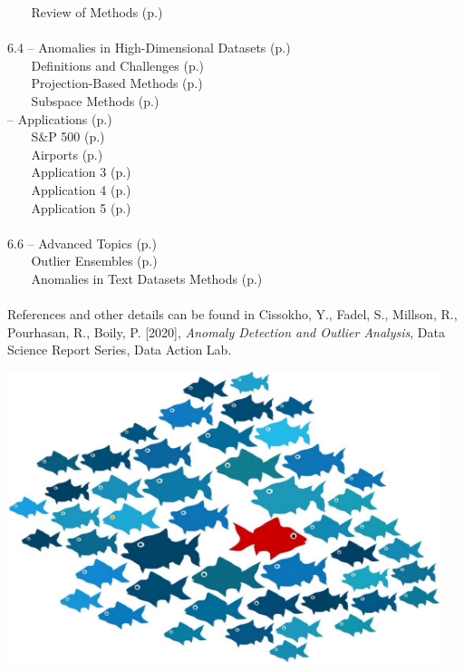 \documentclass[20pt,landscape,footrule,headrule]{foils}
\newcommand{\localtextbulletone}{{\raisebox{.45ex}{\rule{.6ex}{.6ex}}}}
\begin{document}
\textcolor{white}{ab} \localtextbulletone\ Review of Methods (p.\@\pageref{6.3.2}) 
\normalsize \ \\ \ \\ 
6.4 -- Anomalies in High-Dimensional Datasets (p.\pageref{6.4}) \\ 
\small
\textcolor{white}{ab} \localtextbulletone\ Definitions and Challenges (p.\@\pageref{6.4.1}) \\ 
\textcolor{white}{ab} \localtextbulletone\ Projection-Based Methods (p.\@\pageref{6.4.2}) \\ 
\textcolor{white}{ab} \localtextbulletone\ Subspace  Methods (p.\@\pageref{6.4.3}) 
\normalsize
\newpage\ \\  -- Applications  (p.\pageref{6.5}) \\ 
\small
\textcolor{white}{ab} \localtextbulletone\ S\&P 500 (p.\@\pageref{6.5.1}) \\ 
\textcolor{white}{ab} \localtextbulletone\ Airports (p.\@\pageref{6.5.2}) \\ 
\textcolor{white}{ab} \localtextbulletone\ Application 3 (p.\@\pageref{6.5.3}) \\ 
\textcolor{white}{ab} \localtextbulletone\ Application 4 (p.\@\pageref{6.5.4}) \\ 
\textcolor{white}{ab} \localtextbulletone\ Application 5 (p.\@\pageref{6.5.5}) 
\normalsize \ \\ \ \\ 
6.6 -- Advanced Topics (p.\pageref{6.6}) \\ 
\small
\textcolor{white}{ab} \localtextbulletone\ Outlier Ensembles (p.\@\pageref{6.6.1}) \\ 
\textcolor{white}{ab} \localtextbulletone\ Anomalies in Text Datasets Methods (p.\@\pageref{6.6.2})\normalsize 
 \ \\ \ \\ 
References and other details can be found in Cissokho, Y., Fadel, S., Millson, R., Pourhasan, R., Boily, P. [2020], \textit{Anomaly Detection and Outlier Analysis}, Data Science Report Series, Data Action Lab.


\newpage
\begin{center}
\includegraphics[width=0.95\textwidth]{Images/fish.png}
\end{center}
\end{document}
